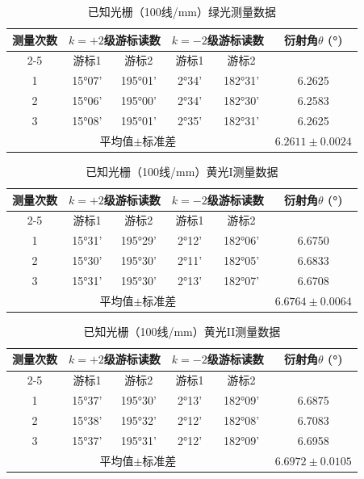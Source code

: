 ﻿\documentclass[12pt,a4paper]{article}
\begin{document}
\begin{table}[H]
\centering
\caption{已知光栅（100线/mm）绿光测量数据}
\label{tab:known_grating_green}
\begin{tabular}{|c|c|c|c|c|c|}
\hline
\multirow{2}{*}{测量次数} & \multicolumn{2}{c|}{$k=+2$级游标读数} & \multicolumn{2}{c|}{$k=-2$级游标读数} & \multirow{2}{*}{衍射角$\theta$ (°)} \\
\cline{2-5}
 & 游标1 & 游标2 & 游标1 & 游标2 & \\
\hline
1 & 15°07' & 195°01' & 2°34' & 182°31' & 6.2625 \\
\hline
2 & 15°06' & 195°00' & 2°34' & 182°30' & 6.2583 \\
\hline
3 & 15°08' & 195°01' & 2°35' & 182°31' & 6.2625 \\
\hline
\multicolumn{5}{|c|}{平均值$\pm$标准差} & $6.2611 \pm 0.0024$ \\
\hline
\end{tabular}
\end{table}

\begin{table}[H]
\centering
\caption{已知光栅（100线/mm）黄光I测量数据}
\label{tab:known_grating_yellow1}
\begin{tabular}{|c|c|c|c|c|c|}
\hline
\multirow{2}{*}{测量次数} & \multicolumn{2}{c|}{$k=+2$级游标读数} & \multicolumn{2}{c|}{$k=-2$级游标读数} & \multirow{2}{*}{衍射角$\theta$ (°)} \\
\cline{2-5}
 & 游标1 & 游标2 & 游标1 & 游标2 & \\
\hline
1 & 15°31' & 195°29' & 2°12' & 182°06' & 6.6750 \\
\hline
2 & 15°30' & 195°30' & 2°11' & 182°05' & 6.6833 \\
\hline
3 & 15°31' & 195°30' & 2°13' & 182°07' & 6.6708 \\
\hline
\multicolumn{5}{|c|}{平均值$\pm$标准差} & $6.6764 \pm 0.0064$ \\
\hline
\end{tabular}
\end{table}

\begin{table}[H]
\centering
\caption{已知光栅（100线/mm）黄光II测量数据}
\label{tab:known_grating_yellow2}
\begin{tabular}{|c|c|c|c|c|c|}
\hline
\multirow{2}{*}{测量次数} & \multicolumn{2}{c|}{$k=+2$级游标读数} & \multicolumn{2}{c|}{$k=-2$级游标读数} & \multirow{2}{*}{衍射角$\theta$ (°)} \\
\cline{2-5}
 & 游标1 & 游标2 & 游标1 & 游标2 & \\
\hline
1 & 15°37' & 195°30' & 2°13' & 182°09' & 6.6875 \\
\hline
2 & 15°38' & 195°32' & 2°12' & 182°08' & 6.7083 \\
\hline
3 & 15°37' & 195°31' & 2°12' & 182°09' & 6.6958 \\
\hline
\multicolumn{5}{|c|}{平均值$\pm$标准差} & $6.6972 \pm 0.0105$ \\
\hline
\end{tabular}
\end{table}
\end{document}
